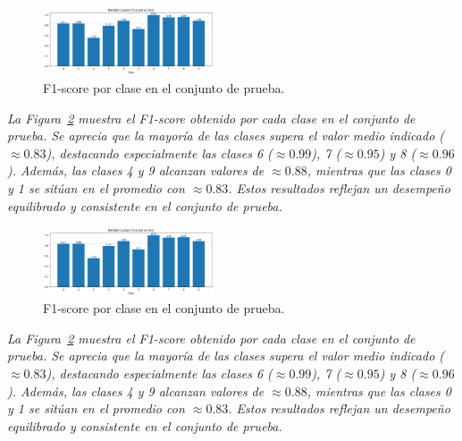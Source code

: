 \documentclass[conference]{IEEEtran}
\begin{document}
\begin{figure}[H]
    \centering
    \includegraphics[width=0.45\textwidth]{graphics-resnet-bilateral/resnet_bilateral_without_class_f1.png}
    \caption{F1-score por clase en el conjunto de prueba.}
    \label{fig:resnet_bilateral_without_class_f1}
\end{figure}
\noindent\textit{%
La Figura~\ref{fig:resnet_bilateral_without_class_f1} muestra el F1-score obtenido por cada clase en el conjunto de prueba. Se aprecia que la mayoría de las clases supera el valor medio indicado (\(\approx0.83\)), destacando especialmente las clases 6 (\(\approx0.99\)), 7 (\(\approx0.95\)) y 8 (\(\approx0.96\)). Además, las clases 4 y 9 alcanzan valores de \(\approx0.88\), mientras que las clases 0 y 1 se sitúan en el promedio con \(\approx0.83\). Estos resultados reflejan un desempeño equilibrado y consistente en el conjunto de prueba.%
}


\begin{figure}[H]
    \centering
    \includegraphics[width=0.45\textwidth]{graphics-resnet-bilateral/resnet_bilateral_without_class_f1.png}
    \caption{F1-score por clase en el conjunto de prueba.}
    \label{fig:resnet_bilateral_without_class_f1}
\end{figure}
\noindent\textit{%
La Figura~\ref{fig:resnet_bilateral_without_class_f1} muestra el F1-score obtenido por cada clase en el conjunto de prueba. Se aprecia que la mayoría de las clases supera el valor medio indicado (\(\approx0.83\)), destacando especialmente las clases 6 (\(\approx0.99\)), 7 (\(\approx0.95\)) y 8 (\(\approx0.96\)). Además, las clases 4 y 9 alcanzan valores de \(\approx0.88\), mientras que las clases 0 y 1 se sitúan en el promedio con \(\approx0.83\). Estos resultados reflejan un desempeño equilibrado y consistente en el conjunto de prueba.%
}
\end{document}
